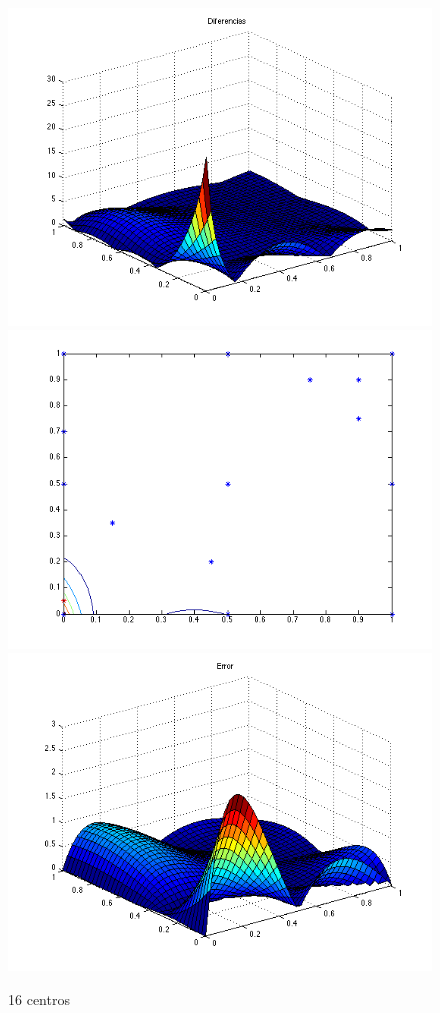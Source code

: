 \documentclass[11pt,a4paper]{article}
\begin{document}
\begin{figure}[H]
\centering

\includegraphics[scale=0.35]{diferencias16.png}
\includegraphics[scale=0.35]{centros16.png}
\includegraphics[scale=0.35]{error16.png}
\caption{16 centros}
\end{figure}
\end{document}
